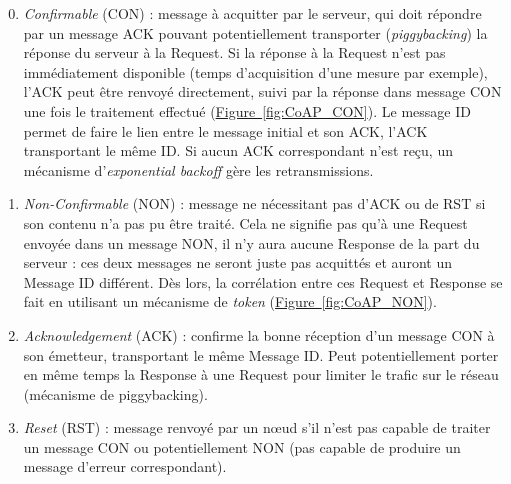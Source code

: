 \documentclass[]{report}
\newcommand{\wordlink}[2]{\hyperref[#2]{#1~\ref{#2}}}
\begin{document}
\begin{enumerate}[leftmargin=*]
\setcounter{enumi}{-1}
\item \textit{Confirmable} (CON) : message à acquitter par le serveur, qui doit répondre par un message ACK pouvant potentiellement transporter (\textit{piggybacking}) la réponse du serveur à la Request. Si la réponse à la Request n'est pas immédiatement disponible (temps d'acquisition d'une mesure par exemple), l'ACK peut être renvoyé directement, suivi par la réponse dans message CON une fois le traitement effectué (\wordlink{Figure}{fig:CoAP_CON}). Le message ID permet de faire le lien entre le message initial et son ACK, l'ACK transportant le même ID. Si aucun ACK correspondant n'est reçu, un mécanisme d'\textit{exponential backoff} gère les retransmissions.
\vspace{0.1cm}

\item  \textit{Non-Confirmable} (NON) : message ne nécessitant pas d'ACK ou de RST si son contenu n'a pas pu être traité. Cela ne signifie pas qu'à une Request envoyée dans un message NON, il n'y aura aucune Response de la part du serveur : ces deux messages ne seront juste pas acquittés et auront un Message ID différent. Dès lors, la corrélation entre ces Request et Response se fait en utilisant un mécanisme de \textit{token} (\wordlink{Figure}{fig:CoAP_NON}).
\vspace{0.1cm}

\item \textit{Acknowledgement} (ACK) : confirme la bonne réception d'un message CON à son émetteur, transportant le même Message ID. Peut potentiellement porter en même temps la Response à une Request pour limiter le trafic sur le réseau (mécanisme de piggybacking).
\vspace{0.1cm}

\item \textit{Reset} (RST) : message renvoyé par un nœud s'il n'est pas capable de traiter un message CON ou potentiellement NON (pas capable de produire un message d'erreur correspondant).
\end{enumerate}

\vspace{0.2cm}
\end{document}
